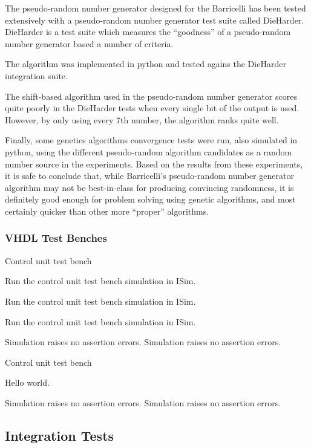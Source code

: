 The pseudo-random number generator designed for the Barricelli has been tested extensively with a pseudo-random number generator test suite called DieHarder\cn.
DieHarder is a test suite which measures the ``goodness'' of a pseudo-random number generator based a number of criteria.

The algorithm was implemented in python and tested agains the DieHarder integration suite\cn.

The shift-based algorithm used in the pseudo-random number generator scores quite poorly in the DieHarder tests when every single bit of the output is used.
However, by only using every 7th number\cn, the algorithm ranks quite well.

Finally, some genetics algorithms convergence tests were run, also simulated in python, using the different pseudo-random algorithm candidates as a random number source in the experiments.
Based on the results from these experiments, it is safe to conclude that, while Barricelli's pseudo-random number generator algorithm may not be best-in-class for producing convincing randomness, it is definitely good enough for problem solving using genetic algorithms, and most certainly quicker than other more ``proper'' algorithms.


\subsubsection{VHDL Test Benches}

\test
{Control unit test bench}{
    \item{Run the control unit test bench simulation in ISim.}
    \item{Run the control unit test bench simulation in ISim.}
    \item{Run the control unit test bench simulation in ISim.}
}{Simulation raises no assertion errors.}
{Simulation raises no assertion errors.}

\test
{Control unit test bench}
{
\item{Hello world.}
}
{Simulation raises no assertion errors.}
{Simulation raises no assertion errors.}

\subsection{Integration Tests}


